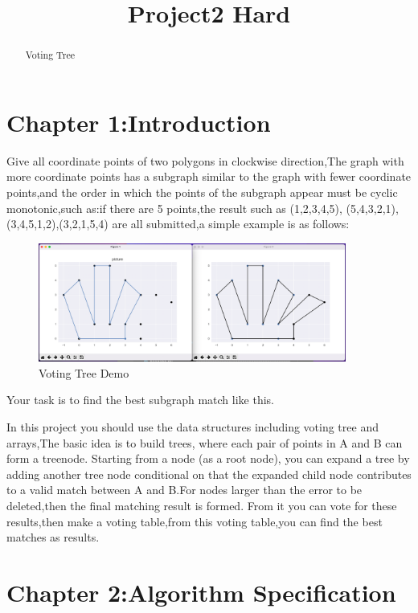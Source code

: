 \documentclass[12pt]{article}
\title{Project2 Hard}
\begin{document}
\maketitle

\begin{abstract}
    Voting Tree
\end{abstract}

\section*{Chapter 1:Introduction}
Give all coordinate points of two polygons in clockwise direction,The graph with more coordinate points 
has a subgraph similar to the graph with fewer coordinate points,and the order in which the points of 
the subgraph appear must be cyclic monotonic,such as:if there are 5 points,the result such as (1,2,3,4,5),
(5,4,3,2,1),(3,4,5,1,2),(3,2,1,5,4) are all submitted,a simple example is as follows:
    \begin{figure}[H]
	\centering
	\includegraphics[width=0.9\textwidth]{1.png}
	\caption{\label{pr}Voting Tree Demo}
	\end{figure}
Your task is to find the best subgraph match like this.

In this project you should use the data structures including voting tree and arrays,The basic idea is to build 
trees, where each pair of points in A and B can form a treenode. Starting from a node (as a root node), you 
can expand a tree by adding another tree node conditional on that the expanded child node contributes to a valid
match between A and B.For nodes larger than the error to be deleted,then the final matching result is formed.
From it you can vote for these results,then make a voting table,from this voting table,you can find the best matches as results.

\section*{Chapter 2:Algorithm Specification}
\end{document}
